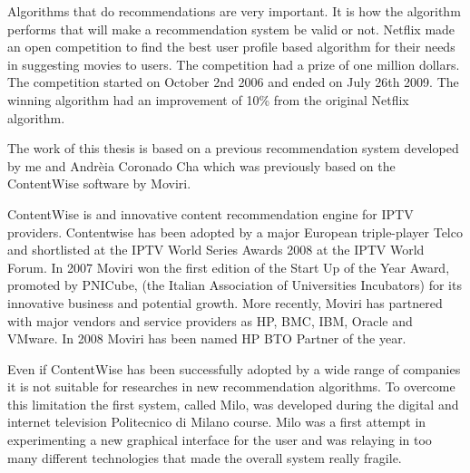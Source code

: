 Algorithms that do recommendations are very important. It is how the algorithm performs that will make a recommendation system be valid or not. Netflix made an open competition \cite{netflixprize} to find the best user profile based algorithm for their needs in suggesting movies to users. The competition had a prize of one million dollars. The competition started on October 2nd 2006 and ended on July 26th 2009. The winning algorithm had an improvement of 10\% from the original Netflix algorithm. 

The work of this thesis is based on a previous recommendation system developed by me and Andrèia Coronado Cha which was previously based on the ContentWise \cite{ContentWise} software by Moviri. 

ContentWise is and innovative content recommendation engine for IPTV providers. Contentwise has been adopted by a major European triple-player Telco and shortlisted at the IPTV World Series Awards 2008 at the IPTV World Forum.
In 2007 Moviri won the first edition of the Start Up of the Year Award, promoted by PNICube, (the Italian Association of Universities Incubators) for its innovative business and potential growth. More recently, Moviri has partnered with major vendors and service providers as HP, BMC, IBM, Oracle and VMware. In 2008 Moviri has been named HP BTO Partner of the year.     

Even if ContentWise has been successfully adopted by a wide range of companies it is not suitable for researches in new recommendation algorithms. To overcome this limitation the first system, called Milo, was developed during the digital and internet television Politecnico di Milano course. Milo was a first attempt in experimenting a new graphical interface for the user and was relaying in too many different technologies that made the overall system really fragile.

